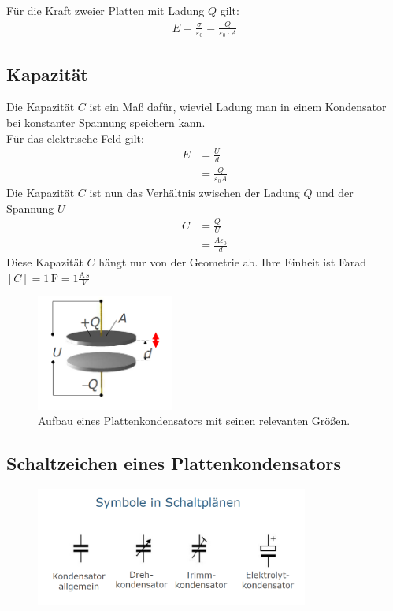 \documentclass{scrartcl}
\begin{document}
\noindent Für die Kraft zweier Platten mit Ladung $Q$ gilt:
\begin{align}
    E=\frac{\sigma}{\varepsilon_0}=\frac{Q}{\varepsilon_0\cdot A}
\end{align}

\subsection{Kapazität}
Die Kapazität $C$ ist ein Maß dafür, wieviel Ladung man in einem Kondensator bei konstanter Spannung speichern kann.\\
Für das elektrische Feld gilt:
\begin{align}
    E&=\frac{U}{d}\\
    &=\frac{Q}{\varepsilon_0A}
\end{align}
Die Kapazität $C$ ist nun das Verhältnis zwischen der Ladung $Q$ und der Spannung $U$
\begin{align}
    C&=\frac{Q}{U}\\
    &=\frac{A\varepsilon_0}{d}
\end{align}
Diese Kapazität $C$ hängt nur von der Geometrie ab.
Ihre Einheit ist Farad $[C]=1\,\mathrm{F}=1\frac{\mathrm{A\,s}}{V}$
\begin{figure}[H]
    \centering
    \includegraphics[width=0.40\textwidth]{aufbau plattenkondensator.png}
    \caption{Aufbau eines Plattenkondensators mit seinen relevanten Größen.}
\end{figure}

\subsection{Schaltzeichen eines Plattenkondensators}
\begin{figure}[H]
    \centering
    \includegraphics[width=0.8\textwidth]{Plattenkondensator schaltplan.png}
\end{figure}
\end{document}

